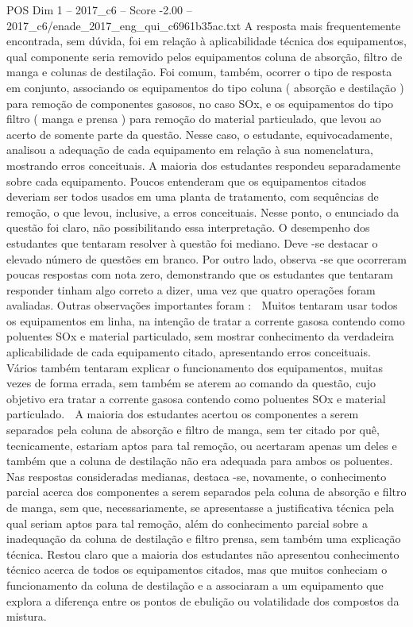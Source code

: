\begin{textsample}{POS Dim 1 – 2017\_c6 – Score -2.00 – 2017\_c6/enade\_2017\_eng\_qui\_c6961b35ac.txt}
A resposta mais frequentemente encontrada, sem dúvida, foi em relação à aplicabilidade técnica dos equipamentos, qual componente seria removido pelos equipamentos coluna de absorção, filtro de manga e colunas de destilação.
Foi comum, também, ocorrer o tipo de resposta em conjunto, associando os equipamentos do tipo coluna ( absorção e destilação ) para remoção de componentes gasosos, no caso SOx, e os equipamentos do tipo filtro ( manga e prensa ) para remoção do material particulado, que levou ao acerto de somente parte da questão.
Nesse caso, o estudante, equivocadamente, analisou a adequação de cada equipamento em relação à sua nomenclatura, mostrando erros conceituais.
A maioria dos estudantes respondeu separadamente sobre cada equipamento.
Poucos entenderam que os equipamentos citados deveriam ser todos usados em uma planta de tratamento, com sequências de remoção, o que levou, inclusive, a erros conceituais.
Nesse ponto, o enunciado da questão foi claro, não possibilitando essa interpretação.
O desempenho dos estudantes que tentaram resolver à questão foi mediano.
Deve -se destacar o elevado número de questões em branco.
Por outro lado, observa -se que ocorreram poucas respostas com nota zero, demonstrando que os estudantes que tentaram responder tinham algo correto a dizer, uma vez que quatro operações foram avaliadas.
Outras observações importantes foram :  Muitos tentaram usar todos os equipamentos em linha, na intenção de tratar a corrente gasosa contendo como poluentes SOx e material particulado, sem mostrar conhecimento da verdadeira aplicabilidade de cada equipamento citado, apresentando erros conceituais.  Vários também tentaram explicar o funcionamento dos equipamentos, muitas vezes de forma errada, sem também se aterem ao comando da questão, cujo objetivo era tratar a corrente gasosa contendo como poluentes SOx e material particulado.  A maioria dos estudantes acertou os componentes a serem separados pela coluna de absorção e filtro de manga, sem ter citado por quê, tecnicamente, estariam aptos para tal remoção, ou acertaram apenas um deles e também que a coluna de destilação não era adequada para ambos os poluentes.
Nas respostas consideradas medianas, destaca -se, novamente, o conhecimento parcial acerca dos componentes a serem separados pela coluna de absorção e filtro de manga, sem que, necessariamente, se apresentasse a justificativa técnica pela qual seriam aptos para tal remoção, além do conhecimento parcial sobre a inadequação da coluna de destilação e filtro prensa, sem também uma explicação técnica.
Restou claro que a maioria dos estudantes não apresentou conhecimento técnico acerca de todos os equipamentos citados, mas que muitos conheciam o funcionamento da coluna de destilação e a associaram a um equipamento que explora a diferença entre os pontos de ebulição ou volatilidade dos compostos da mistura.

\end{textsample}
